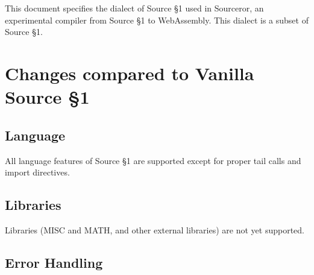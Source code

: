 

\newcommand{\Rule}[2]{\genfrac{}{}{0.7pt}{}{{\setlength{\fboxrule}{0pt}\setlength{\fboxsep}{3mm}\fbox{$#1$}}}{{\setlength{\fboxrule}{0pt}\setlength{\fboxsep}{3mm}\fbox{$#2$}}}}

\newcommand{\TruE}{\textbf{\texttt{true}}}
\newcommand{\FalsE}{\textbf{\texttt{false}}}
\newcommand{\Rc}{\texttt{\}}}
\newcommand{\Lc}{\texttt{\{}}
\newcommand{\Rp}{\texttt{)}}
\newcommand{\Lp}{\texttt{(}}
\newcommand{\Fun}{\textbf{\texttt{function}}}
\newcommand{\Let}{\textbf{\texttt{let}}}
\newcommand{\Return}{\textbf{\texttt{return}}}
\newcommand{\Const}{\textbf{\texttt{const}}}
\newcommand{\If}{\textbf{\texttt{if}}}
\newcommand{\Else}{\textbf{\texttt{else}}}
\newcommand{\Bool}{\texttt{bool}}
\newcommand{\Number}{\texttt{number}}
\newcommand{\String}{\texttt{string}}
\newcommand{\Undefined}{\texttt{undefined}}

\newtheorem{definition}{Definition}[section]



This document specifies the dialect of Source \S 1 used in Sourceror, an experimental compiler from Source \S 1 to WebAssembly.  This dialect is a subset of Source \S 1.

\section{Changes compared to Vanilla Source \S 1}

\subsection*{Language}  

All language features of Source \S 1 are supported except for proper tail calls and
import directives.

\subsection*{Libraries}

Libraries (MISC and MATH, and other external libraries) are not yet supported.

\subsection*{Error Handling}

